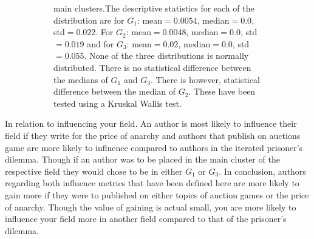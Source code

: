 \documentclass{article}
\theoremstyle{definition}
\begin{document}
\begin{figure}[!hbtp]
\begin{subfigure}{\textwidth}
{        main clusters.The descriptive
        statistics for each of the distribution are for \(G_1\): mean\(=0.0054\),
        median\(=0.0\), std\(=0.022\). For \(G_2\): mean\(=0.0048\), median\(=0.0\),
        std\(=0.019\) and for \(G_3\): mean\(=0.02\), median\(=0.0\), std\(=0.055\).
        None of the three distributions is normally distributed. There is no
        statistical difference between the medians of \(G_1\) and \(G_3\). There
        is however, statistical difference between the median of \(G_2\).
        These have been tested using a Kruskal Wallis test.}\label{fig:betweenness_dist_cluster}
    \end{subfigure}%
\end{figure}

In relation to influencing your field. An author is most likely to influence their
field if they write for the price of anarchy and authors that publish on auctions
game are more likely to influence compared to authors in the iterated prisoner's
dilemma. Though if an author was to be placed in the main cluster of the respective
field they would chose to be in either \(G_1\) or \(G_3\).
In conclusion, authors regarding both influence metrics that have been defined here
are more likely to gain more if they were to published on either topics of auction
games or the price of anarchy. Though the value of gaining is actual small,
you are more likely to influence your field more in another field compared to that
of the prisoner's dilemma.
\end{document}
